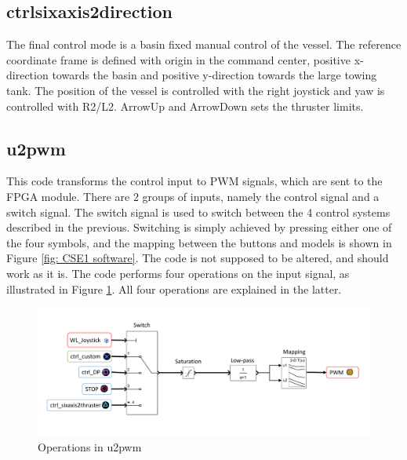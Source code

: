 \subsection{ctrl\textunderscore sixaxis2direction}
The final control mode is a basin fixed manual control of the vessel. The reference coordinate frame is defined with origin in the command center, positive x-direction towards the basin and positive y-direction towards the large towing tank. The position of the vessel is controlled with the right joystick and yaw is controlled with R2/L2. ArrowUp and ArrowDown sets the thruster limits. 
\subsection{u2pwm}
This code transforms the control input to PWM signals, which are sent to the FPGA module. There are 2 groups of inputs, namely the control signal and a switch signal. The switch signal is used to switch between the 4 control systems described in the previous. Switching is simply achieved by pressing either one of the four symbols, and the mapping between the buttons and models is shown in Figure \ref{fig: CSE1 software}. The code is not supposed to be altered, and should work as it is. The code performs four operations on the input signal, as illustrated in Figure \ref{fig:u2pwm_overview}. All four operations are explained in the latter. 
\begin{figure}[htb!]
	\centering
	\includegraphics[width=\linewidth]{fig/u2pwm.pdf}
	\caption{Operations in u2pwm}
	\label{fig:u2pwm_overview}
\end{figure}
